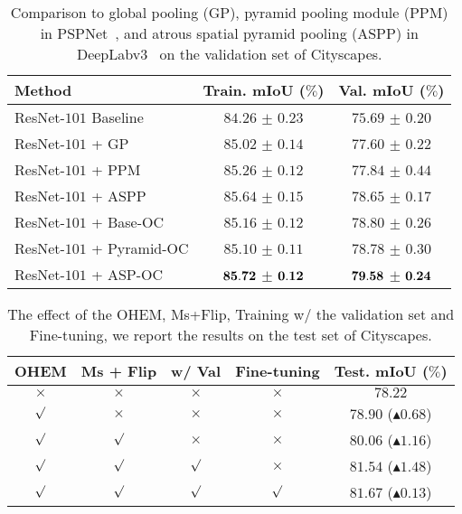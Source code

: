 \documentclass[10pt,twocolumn,letterpaper]{article}
\begin{document}
\begin{table}[htb]
\centering
\footnotesize
\caption{\small{Comparison to global pooling (GP), pyramid pooling module (PPM) in PSPNet~\cite{zhao2017pyramid},
and atrous spatial pyramid pooling (ASPP) in DeepLabv3~\cite{chen2017rethinking} on the validation set of Cityscapes.}}
\begin{tabular}{l|c|c} \hline
Method &  Train. mIoU ($\%$) & Val. mIoU ($\%$)  \\
\hline
ResNet-$101$ Baseline  &   $84.26$ $\pm$ $0.23$  &  $75.69$ $\pm$ $0.20$  \\ \hline
ResNet-$101$ + GP~\cite{liu2015parsenet}  &  $85.02$ $\pm$ $0.14$  &  $77.60$ $\pm$ $0.22$  \\
ResNet-$101$ + PPM~\cite{zhao2017pyramid}  &   $85.26$ $\pm$ $0.12$  &  $77.84$ $\pm$ $0.44$  \\
ResNet-$101$ + ASPP~\cite{chen2017rethinking} &  $85.64$ $\pm$ $0.15$ &  $78.65$ $\pm$ $0.17$  \\ \hline
ResNet-$101$ + Base-OC  &   $85.16$ $\pm$ $0.12$ &  $78.80$ $\pm$ $0.26$  \\
ResNet-$101$ + Pyramid-OC  &  $85.10$ $\pm$ $0.11$ &  $78.78$ $\pm$ $0.30$  \\
ResNet-$101$ + ASP-OC &  $\bf{85.72}$ $\pm$ $\bf{0.12}$  &  $\bf{79.58}$ $\pm$ $\bf{0.24}$  \\
\hline
\end{tabular}
\label{table:ocvsppmasppgc}
\end{table}

\begin{table}[htb]
\centering
\footnotesize
\caption{\small{The effect of the OHEM, Ms+Flip, Training w/ the validation set and Fine-tuning, we report the results on the test set of Cityscapes.}}
\begin{tabular}{c|c|c|c|c} \hline
OHEM & Ms + Flip &  w/ Val & Fine-tuning & Test. mIoU ($\%$)  \\
\hline
 $\times$ & $\times$ & $\times$ & $\times$  & $78.22$ \\
 $\surd$ & $\times$ & $\times$  & $\times$  & $78.90$ ($\blacktriangle 0.68$) \\
 $\surd$ & $\surd$ & $\times$   & $\times$  & $80.06$ ($\blacktriangle 1.16$) \\
 $\surd$ & $\surd$ & $\surd$    & $\times$  & $81.54$ ($\blacktriangle 1.48$) \\
 $\surd$ & $\surd$ & $\surd$   & $\surd$    & $81.67$ ($\blacktriangle 0.13$) \\
\hline
\end{tabular}
\label{table:ocnet_ms_ohem}
\end{table}
\end{document}
